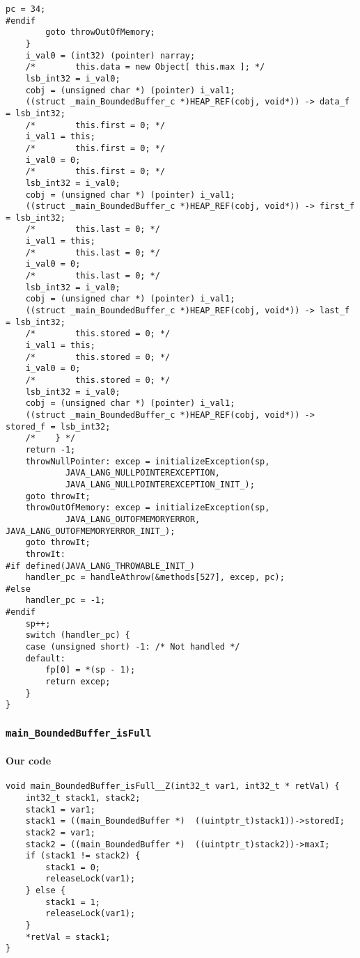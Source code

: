 \begin{lstlisting}[firstnumber=54903]
		pc = 34;
#endif
		goto throwOutOfMemory;
	}
	i_val0 = (int32) (pointer) narray;
	/*        this.data = new Object[ this.max ]; */
	lsb_int32 = i_val0;
	cobj = (unsigned char *) (pointer) i_val1;
	((struct _main_BoundedBuffer_c *)HEAP_REF(cobj, void*)) -> data_f = lsb_int32;
	/*        this.first = 0; */
	i_val1 = this;
	/*        this.first = 0; */
	i_val0 = 0;
	/*        this.first = 0; */
	lsb_int32 = i_val0;
	cobj = (unsigned char *) (pointer) i_val1;
	((struct _main_BoundedBuffer_c *)HEAP_REF(cobj, void*)) -> first_f = lsb_int32;
	/*        this.last = 0; */
	i_val1 = this;
	/*        this.last = 0; */
	i_val0 = 0;
	/*        this.last = 0; */
	lsb_int32 = i_val0;
	cobj = (unsigned char *) (pointer) i_val1;
	((struct _main_BoundedBuffer_c *)HEAP_REF(cobj, void*)) -> last_f = lsb_int32;
	/*        this.stored = 0; */
	i_val1 = this;
	/*        this.stored = 0; */
	i_val0 = 0;
	/*        this.stored = 0; */
	lsb_int32 = i_val0;
	cobj = (unsigned char *) (pointer) i_val1;
	((struct _main_BoundedBuffer_c *)HEAP_REF(cobj, void*)) -> stored_f = lsb_int32;
	/*    } */
	return -1;
	throwNullPointer: excep = initializeException(sp,
			JAVA_LANG_NULLPOINTEREXCEPTION,
			JAVA_LANG_NULLPOINTEREXCEPTION_INIT_);
	goto throwIt;
	throwOutOfMemory: excep = initializeException(sp,
			JAVA_LANG_OUTOFMEMORYERROR, JAVA_LANG_OUTOFMEMORYERROR_INIT_);
	goto throwIt;
	throwIt:
#if defined(JAVA_LANG_THROWABLE_INIT_)
	handler_pc = handleAthrow(&methods[527], excep, pc);
#else
	handler_pc = -1;
#endif
	sp++;
	switch (handler_pc) {
	case (unsigned short) -1: /* Not handled */
	default:
		fp[0] = *(sp - 1);
		return excep;
	}
}
\end{lstlisting}

\subsubsection{\texttt{main\_BoundedBuffer\_isFull}}

\paragraph{Our code}\hfill
\begin{lstlisting}[firstnumber=1820]
void main_BoundedBuffer_isFull__Z(int32_t var1, int32_t * retVal) {
	int32_t stack1, stack2;
	stack1 = var1;
	stack1 = ((main_BoundedBuffer *)  ((uintptr_t)stack1))->storedI;
	stack2 = var1;
	stack2 = ((main_BoundedBuffer *)  ((uintptr_t)stack2))->maxI;
	if (stack1 != stack2) {
		stack1 = 0;
		releaseLock(var1);
	} else {
		stack1 = 1;
		releaseLock(var1);
	}
	*retVal = stack1;
}
\end{lstlisting}

